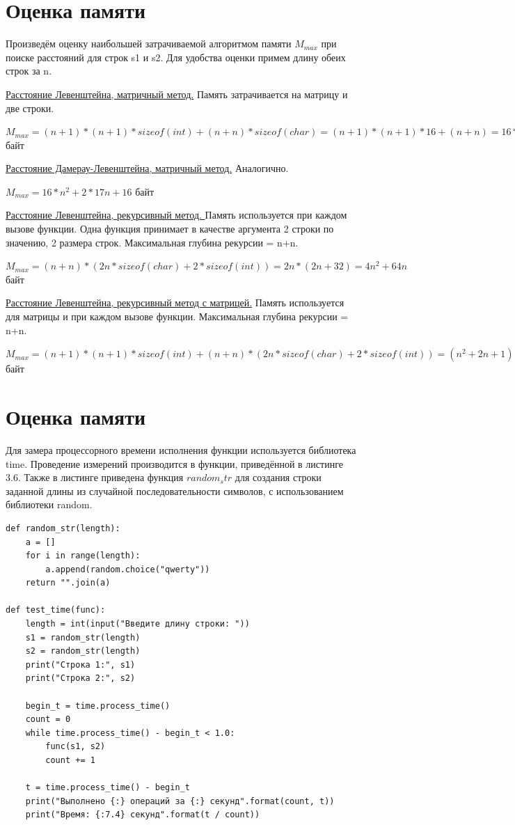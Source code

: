 \documentclass[10pt,a4paper]{report}
\begin{document}
	\section{Оценка памяти}
	Произведём оценку наибольшей затрачиваемой алгоритмом памяти $M_{max}$ при поиске расстояний для строк s1 и s2. Для удобства оценки примем длину обеих строк за n.
	
	\underline{Расстояние Левенштейна, матричный метод.} 
	Память затрачивается на матрицу и две строки.
	\par $M_{max} = (n+1)*(n+1)*sizeof(int) + (n+n)*sizeof(char) = 
	(n+1)*(n+1)*16 + (n+n) = 16*n^2 + 2*17n + 16 $ байт
	
	\underline{Расстояние Дамерау-Левенштейна, матричный метод.} 
	Аналогично.
	\par $M_{max} = 16*n^2 + 2*17n + 16 $ байт
	
	\underline{Расстояние Левенштейна, рекурсивный метод. }
	Память используется при каждом вызове функции. Одна функция принимает в качестве аргумента 2 строки по значению, 2 размера строк. Максимальная глубина рекурсии = n+n.
	\par $M_{max} = (n+n)*(2n*sizeof(char) + 2*sizeof(int)) = 2n*(2n + 32) = 4n^2 + 64n $ байт
	
	\underline{Расстояние Левенштейна, рекурсивный метод с матрицей.}
	Память используется для матрицы и при каждом вызове функции. Максимальная глубина рекурсии = n+n.
	\par $M_{max} = (n+1)*(n+1)*sizeof(int) + (n+n)*(2n*sizeof(char) + 2*sizeof(int)) = (n^2+2n+1)*16 + 2n*(2n + 32) = 20n^2 + 96n  + 16 $ байт
	
	\section{Оценка памяти}
	Для замера процессорного времени исполнения функции используется библиотека time. Проведение измерений производится в функции, приведённой в листинге 3.6. Также в листинге приведена функция $random_str$ для создания строки заданной длины из случайной последовательности символов, с использованием библиотеки random.
	
	\begin{lstlisting}[caption = Функция замера процессорного времени работы функции]
def random_str(length):
	a = []
	for i in range(length):
		a.append(random.choice("qwerty"))
	return "".join(a)

def test_time(func):
	length = int(input("Введите длину строки: "))
	s1 = random_str(length)
	s2 = random_str(length)
	print("Строка 1:", s1)
	print("Строка 2:", s2)
	
	begin_t = time.process_time()
	count = 0
	while time.process_time() - begin_t < 1.0:
		func(s1, s2)
		count += 1
	
	t = time.process_time() - begin_t
	print("Выполнено {:} операций за {:} секунд".format(count, t))
	print("Время: {:7.4} секунд".format(t / count))
	\end{lstlisting}
\end{document}
